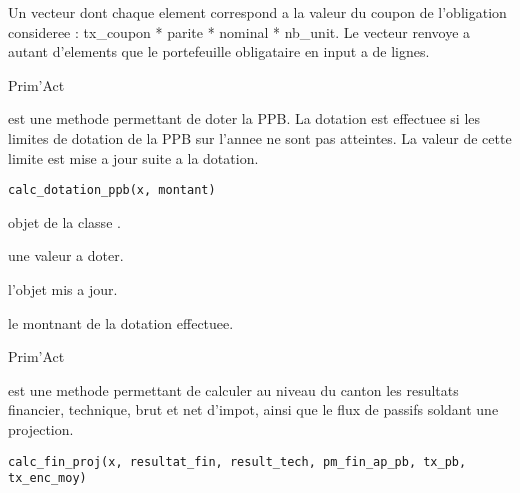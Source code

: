 \documentclass[a4paper]{book}
\begin{document}
%
\begin{Value}
Un vecteur dont chaque element correspond a la valeur du coupon de l'obligation consideree : tx\_coupon * parite * nominal * nb\_unit.
Le vecteur renvoye a autant d'elements que le portefeuille obligataire en input a de lignes.
\end{Value}
%
\begin{Author}\relax
Prim'Act
\end{Author}
%
\begin{Description}\relax
{} est une methode permettant de doter la PPB. La dotation est effectuee si les
limites de dotation de la PPB sur l'annee ne sont pas atteintes. La valeur de cette limite est mise a jour suite a la dotation.
\end{Description}
%
\begin{Usage}
\begin{verbatim}
calc_dotation_ppb(x, montant)
\end{verbatim}
\end{Usage}
%
\begin{Arguments}
\begin{ldescription}
\item[\code{x}] objet de la classe .

\item[\code{montant}] une valeur  a doter.
\end{ldescription}
\end{Arguments}
%
\begin{Value}
 l'objet  mis a jour.

 le montnant de la dotation effectuee.
\end{Value}
%
\begin{Author}\relax
Prim'Act
\end{Author}
%
\begin{Description}\relax
{} est une methode permettant de calculer au niveau du canton les resultats financier, technique,
brut et net d'impot, ainsi que le flux de passifs soldant une projection.
\end{Description}
%
\begin{Usage}
\begin{verbatim}
calc_fin_proj(x, resultat_fin, result_tech, pm_fin_ap_pb, tx_pb, tx_enc_moy)
\end{verbatim}
\end{Usage}
\end{document}
